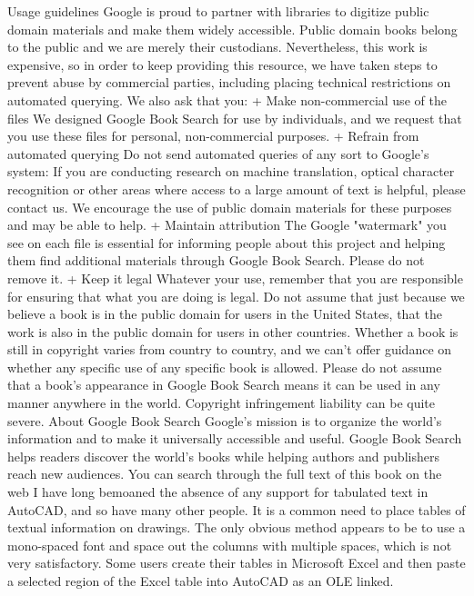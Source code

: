\documentclass[a4paper]{article}
\begin{document}
{Usage guidelines 
Google is proud to partner with libraries to digitize public domain materials and make them widely accessible. Public domain books belong to the 
public and we are merely their custodians. Nevertheless, this work is expensive, so in order to keep providing this resource, we have taken steps to 
prevent abuse by commercial parties, including placing technical restrictions on automated querying. 
We also ask that you: 
+ Make non-commercial use of the files We designed Google Book Search for use by individuals, and we request that you use these files for 
personal, non-commercial purposes. 
+ Refrain from automated querying Do not send automated queries of any sort to Google's system: If you are conducting research on machine 
translation, optical character recognition or other areas where access to a large amount of text is helpful, please contact us. We encourage the 
use of public domain materials for these purposes and may be able to help. 
+ Maintain attribution The Google "watermark" you see on each file is essential for informing people about this project and helping them find 
additional materials through Google Book Search. Please do not remove it. 
+ Keep it legal Whatever your use, remember that you are responsible for ensuring that what you are doing is legal. Do not assume that just 
because we believe a book is in the public domain for users in the United States, that the work is also in the public domain for users in other 
countries. Whether a book is still in copyright varies from country to country, and we can't offer guidance on whether any specific use of 
any specific book is allowed. Please do not assume that a book's appearance in Google Book Search means it can be used in any manner 
anywhere in the world. Copyright infringement liability can be quite severe. 
About Google Book Search 
Google's mission is to organize the world's information and to make it universally accessible and useful. Google Book Search helps readers 
discover the world's books while helping authors and publishers reach new audiences. You can search through the full text of this book on the web 
I have long bemoaned the absence of any support for tabulated text in AutoCAD, and so have many other people. It is a common need to place tables of textual information on drawings. The only obvious method appears to be to use a mono-spaced font and space out the columns with multiple spaces, which is not very satisfactory.
Some users create their tables in Microsoft Excel and then paste a selected region of the Excel table into AutoCAD as an OLE linked.
}
\end{document}
